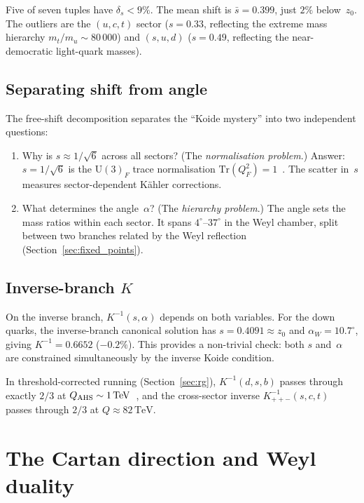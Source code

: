 \documentclass[preprint,12pt]{elsarticle}
\newcommand{\UU}{\mathrm{U}}
\newcommand{\Tr}{\mathrm{Tr}}
\newcommand{\TeV}{\,\mathrm{TeV}}
\begin{document}
\noindent Five of seven tuples have $\delta_s < 9\%$.
The mean shift is $\bar{s} = 0.399$, just $2\%$ below~$z_0$.
The outliers are the $(u,c,t)$ sector ($s = 0.33$, reflecting
the extreme mass hierarchy $m_t/m_u \sim 80\,000$) and
$(s,u,d)$ ($s = 0.49$, reflecting the near-democratic light-quark
masses).

\subsection{Separating shift from angle}

The free-shift decomposition separates the ``Koide mystery'' into
two independent questions:
\begin{enumerate}
\item Why is $s \approx 1/\sqrt{6}$ across all sectors?
  (The \emph{normalisation problem}.)
  Answer: $s = 1/\sqrt{6}$ is the $\UU(3)_F$ trace normalisation
  $\Tr(Q_F^2) = 1$~\cite{letter_q2}.  The scatter in~$s$
  measures sector-dependent K\"ahler corrections.

\item What determines the angle~$\alpha$?
  (The \emph{hierarchy problem}.)
  The angle sets the mass ratios within each sector.
  It spans $4^\circ$--$37^\circ$ in the Weyl chamber, split
  between two branches related by the Weyl reflection
  (Section~\ref{sec:fixed_points}).
\end{enumerate}

\subsection{Inverse-branch $K$}

On the inverse branch, $K^{-1}(s, \alpha)$ depends on both
variables.  For the down quarks, the inverse-branch canonical
solution has $s = 0.4091 \approx z_0$ and
$\alpha_W = 10.7^\circ$, giving
$K^{-1} = 0.6652$ ($-0.2\%$).
This provides a non-trivial check: both $s$ and~$\alpha$
are constrained simultaneously by the inverse Koide condition.

In threshold-corrected running (Section~\ref{sec:rg}),
$K^{-1}(d,s,b)$ passes through exactly $2/3$ at
$Q_{\rm AHS} \sim 1\TeV$~\cite{AHS:2005}, and the
cross-sector inverse $K^{-1}_{++-}(s,c,t)$ passes
through $2/3$ at $Q \approx 82\TeV$.


\section{The Cartan direction and Weyl duality}
\label{sec:alignment}
\end{document}
